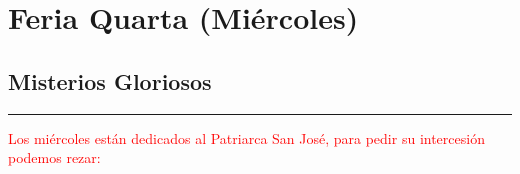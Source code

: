\documentclass[10pt,twoside]{book}
\begin{document}

\section*{\centering Feria Quarta (Miércoles)}

\noindent\subsection*{Misterios Gloriosos}



\vspace{0.5em}



\vspace{1.5em}





\vspace{1.5em}





\vspace{1.5em}





\vspace{1.5em}



{}

\iralfinal

\begin{center}
      {\rule{10em}{0.4pt}}

      \vspace{0.75em}

      \textcolor{red}{Los miércoles están dedicados al Patriarca San José, para pedir su intercesión podemos rezar:}
\end{center}
\vspace{-1em}
\begin{multicols}{2}
      
\end{multicols}
\end{document}
